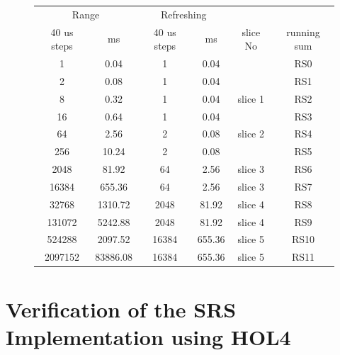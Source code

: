 \documentclass{llncs}
\begin{document}
\begin{figure}[t]
\centering
\begin{tabular}{|c|c|c|c|c|c|}
\hline
\multicolumn{2}{|c}{Range} &\multicolumn{2}{|c|}{Refreshing} & & \\\cline{1-4}
40 us steps & ms & 40 us steps  & ms & slice No & running sum \\\hline\hline
1 & 0.04 & 1 & 0.04 & & RS0 \\\hline
2 & 0.08 & 1 & 0.04 & & RS1 \\\hline
8 & 0.32 & 1 & 0.04 & slice 1 & RS2 \\\hline
16 & 0.64 & 1 & 0.04 & & RS3 \\\hline
64 & 2.56 & 2 & 0.08 & slice 2 & RS4 \\\hline
256 & 10.24 & 2 & 0.08 & & RS5 \\\hline
2048 & 81.92 & 64 & 2.56 &slice  3 & RS6 \\\hline
16384 & 655.36 & 64 & 2.56 &slice 3 & RS7 \\\hline
32768 &1310.72 & 2048 & 81.92 & slice 4 & RS8 \\\hline
131072 & 5242.88 & 2048 & 81.92 & slice 4 & RS9 \\\hline
524288 & 2097.52 & 16384 & 655.36 & slice 5 &RS10 \\\hline
2097152 & 83886.08 & 16384 & 655.36 & slice 5 & RS11 \\\hline

\end{tabular}
\vspace{0.04in}
\label{fig:example-bakery}
\caption{}
\end{figure}


\section{Verification of the SRS Implementation using HOL4}
\label{sec-verification}

\end{document}
